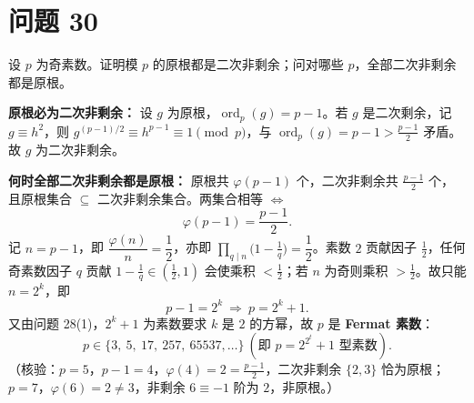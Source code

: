\documentclass{article}
\newcommand{\ord}{\operatorname{ord}}
\begin{document}
\section{问题 30}

设 $p$ 为奇素数。证明模 $p$ 的原根都是二次非剩余；问对哪些 $p$，全部二次非剩余都是原根。

\begin{solution}
  \textbf{原根必为二次非剩余：} 设 $g$ 为原根，$\ord_p(g)=p-1$。若 $g$ 是二次剩余，记 $g\equiv h^2$，则 $g^{(p-1)/2}\equiv h^{p-1}\equiv1\pmod p$，与 $\ord_p(g)=p-1>\tfrac{p-1}2$ 矛盾。故 $g$ 为二次非剩余。

  \textbf{何时全部二次非剩余都是原根：} 原根共 $\varphi(p-1)$ 个，二次非剩余共 $\tfrac{p-1}2$ 个，且原根集合 $\subseteq$ 二次非剩余集合。两集合相等 $\iff$
  \[
    \varphi(p-1)=\frac{p-1}{2}.
  \]
  记 $n=p-1$，即 $\dfrac{\varphi(n)}{n}=\dfrac12$，亦即 $\prod_{q\mid n}\big(1-\tfrac1q\big)=\dfrac12$。素数 $2$ 贡献因子 $\tfrac12$，任何奇素数因子 $q$ 贡献 $1-\tfrac1q\in(\tfrac12,1)$ 会使乘积 $<\tfrac12$；若 $n$ 为奇则乘积 $>\tfrac12$。故只能 $n=2^k$，即
  \[
    p-1=2^k\ \Longrightarrow\ p=2^k+1 .
  \]
  又由问题 28(1)，$2^k+1$ 为素数要求 $k$ 是 $2$ 的方幂，故 $p$ 是 \textbf{Fermat 素数}：
  \[
    \boxed{\ p\in\{3,\ 5,\ 17,\ 257,\ 65537,\dots\}\ (\text{即 }p=2^{2^t}+1\text{ 型素数}).\ }
  \]
  （核验：$p=5$，$p-1=4$，$\varphi(4)=2=\tfrac{p-1}2$，二次非剩余 $\{2,3\}$ 恰为原根；$p=7$，$\varphi(6)=2\ne3$，非剩余 $6\equiv-1$ 阶为 $2$，非原根。）
\end{solution}
\end{document}

